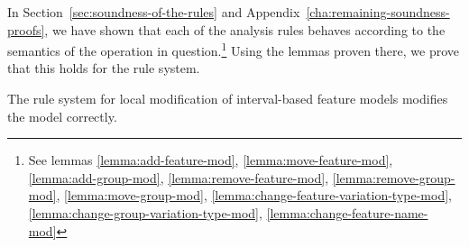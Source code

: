 In Section~\vref{sec:soundness-of-the-rules} and Appendix~\ref{cha:remaining-soundness-proofs}, we have shown that each of the analysis rules behaves according to the semantics of the operation in question.\footnote{See lemmas \ref{lemma:add-feature-mod}, \ref{lemma:move-feature-mod}, \ref{lemma:add-group-mod}, \ref{lemma:remove-feature-mod}, \ref{lemma:remove-group-mod}, \ref{lemma:move-group-mod}, \ref{lemma:change-feature-variation-type-mod}, \ref{lemma:change-group-variation-type-mod}, \ref{lemma:change-feature-name-mod}} Using the lemmas proven there, we prove that this holds for the rule system.
\\
\begin{theorem}
  The rule system for local modification of interval-based feature models modifies the model correctly.
\end{theorem}

